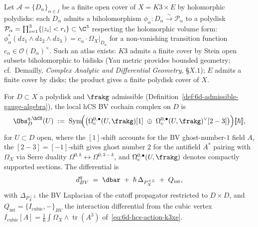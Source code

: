 Let $\mathcal{A} = \{D_\alpha\}_{\alpha \in I}$ be a finite open cover of
$X = K3 \times E$ by holomorphic polydisks: each $D_\alpha$ admits a
biholomorphism $\phi_\alpha: D_\alpha \xrightarrow{\sim} \mathcal{P}_\alpha$
to a polydisk $\mathcal{P}_\alpha = \prod_{i=1}^3 \{|z_i| < r_i\} \subset \C^3$
respecting the holomorphic volume form: $\phi_\alpha^* (dz_1 \wedge dz_2 \wedge dz_3) = c_\alpha \cdot \Omega_X|_{D_\alpha}$
for a non-vanishing transition function $c_\alpha \in \mathcal{O}(D_\alpha)^\times$.
Such an atlas exists: $K3$ admits a finite cover by Stein open subsets
biholomorphic to bidisks (Yau metric provides bounded geometry; cf.~Demailly,
\emph{Complex Analytic and Differential Geometry}, \S$X.1$); $E$ admits a
finite cover by disks; the product gives a finite polydisk cover of $X$.

\begin{definition}
\label{def:hcs-pre-fa-local}
For $D \subset X$ a polydisk and $\frakg$ admissible
\textup{(Definition~\ref{def:6d-admissible-gauge-algebra})}, the local hCS
BV cochain complex on $D$ is
\begin{equation}
\label{eq:hcs-bv-cochains-local}
 \Obs^{q,\hCS}_D(U) \;:=\; \operatorname{Sym}\!\Bigl(\bigl(\Omega^{0, \bullet}_c(U, \frakg)[1] \;\oplus\; \Omega^{0, \bullet}_c(U, \frakg)^\vee[2 - 3]\bigr)\Bigr)[\![\hbar]\!],
\end{equation}
for $U \subset D$ open, where the $[1]$-shift accounts for the BV
ghost-number-$1$ field $A$, the $[2 - 3] = [-1]$-shift gives ghost
number $2$ for the antifield $A^*$ pairing with $\Omega_X$ via Serre
duality $\Omega^{0, k} \leftrightarrow \Omega^{0, 3-k}$, and
$\Omega^{0, \bullet}_c(U, \frakg)$ denotes compactly supported sections.
The differential is
\begin{equation}
\label{eq:hcs-bv-differential-local}
 d_{BV}^q \;=\; \dbar \;+\; \hbar\, \Delta_{P_X^{<L}} \;+\; Q_{\mathrm{int}},
\end{equation}
with $\Delta_{P_X^{<L}}$ the BV Laplacian of the cutoff propagator
restricted to $D \times D$, and $Q_{\mathrm{int}} = \{ I_{\mathrm{cubic}}, - \}_{BV}$
the interaction differential from the cubic vertex
$I_{\mathrm{cubic}}[A] = \tfrac{1}{6} \int \Omega_X \wedge \operatorname{tr}(A^3)$
of~\eqref{eq:6d-hcs-action-k3xe}.
\end{definition}

